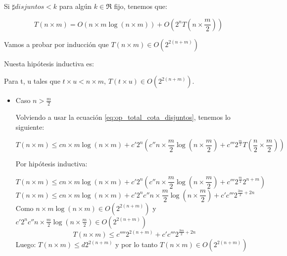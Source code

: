 \documentclass[a4paper, 12pt] {article}
\begin{document}
Si $\sharp disjuntos < k$ para alg\'un  $k \in \Re$  fijo, tenemos que:

\begin{equation} \label{eq:op_total_cota_disjuntos}
T\left( n \times m\right) = O\left( n\times m \log \left( n\times m\right) \right) + O \left( 2^{n}T\left( n \times \frac{m}{2} \right) \right) 
\end{equation}

Vamos a probar por inducci\'on que $\textstyle T\left( n \times m \right) \in O\left( 2^{2\left( n+m\right)  }\right)$


Nuesta hip\'otesis inductiva es:

Para t, u tales que $ t \times u < n \times m $, $ T(t \times u) \in O\left( 2^{2\left( n + m\right) }\right) $.
\begin{itemize}
 \item Caso $n > \frac{m}{2} $

Volviendo a usar la ecuaci\'on \ref{eq:op_total_cota_disjuntos}, tenemos lo siguiente: 

\begin{equation}
T\left( n \times m \right) \leq c n\times m \log \left(n\times m \right) + c' 2^{n}\left( c'' n\times \frac{m}{2} \log \left( n \times \frac{m}{2} \right) + c''' 2^{\frac{m}{2}}T\left( \frac{n}{2} \times \frac{m}{2} \right) \right)
\end{equation}



Por hip\'otesis inductiva:


\begin{equation}
T\left( n \times m \right) \leq c n\times m \log \left(n\times m \right) + c' 2^{n}\left( c'' n\times \frac{m}{2} \log \left( n \times \frac{m}{2} \right) + c''' 2^{\frac{m}{2}} 2^{n+m} \right)
\end{equation}
\begin{equation}
T\left( n \times m \right) \leq c n\times m \log \left(n\times m \right) +  c' 2^{n}c'' n\times \frac{m}{2} \log \left( n \times \frac{m}{2} \right) + c'c''' 2^{\frac{3m}{2} + 2n}  
\end{equation}
Como $n\times m \log \left(n\times m \right) \in O\left(2^{2\left(n+m\right)}\right)$ y $ c' 2^{n}c'' n\times \frac{m}{2} \log \left( n \times \frac{m}{2} \right) \in O\left(2^{2\left(n+m\right)}\right)$
\begin{equation}
T\left( n \times m \right) \leq c'''' 2^{2\left(n+m\right)}+ c'c''' 2^{\frac{3m}{2} + 2n}  
\end{equation}
Luego:
$T\left( n \times m \right) \leq d 2^{2\left(n+m\right)}$ y por lo tanto $T\left( n\times m \right) \in O\left( 2^{2\left(n+m\right)}\right)$




\end{itemize}
\end{document}
